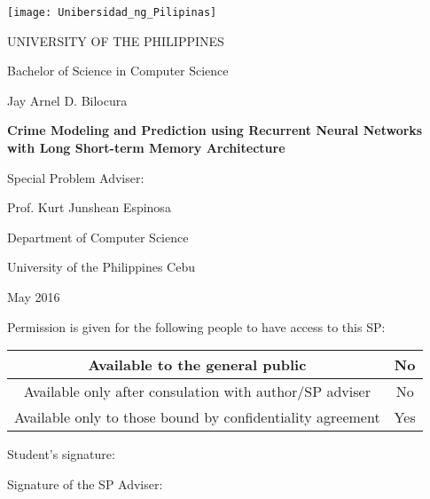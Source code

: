 \begin{permission}
    \texttt{[image: Unibersidad\_ng\_Pilipinas]}
    \par\MakeUppercase{University of the Philippines}
    \par Bachelor of Science in Computer Science
    \vspace{1cm}
    \par Jay Arnel D. Bilocura
    \vspace{1cm}
    \par\textbf{Crime Modeling and Prediction using Recurrent Neural Networks with Long Short-term Memory Architecture}
    \vspace{1cm}
    \par Special Problem Adviser:
    \par Prof. Kurt Junshean Espinosa
    \vspace{1cm}
    \par Department of Computer Science
    \par University of the Philippines Cebu
    \vspace{1cm}
    \par May 2016
    \vspace{1cm}
    \par Permission is given for the following people to have access to this SP:
    \begin{table}[H]
      \centering
      \begin{tabular}{|c|c|}
          \hline
          Available to the general public &No \\
          \hline
          Available only after consulation with author/SP adviser &No \\
          \hline
          Available only to those bound by confidentiality agreement &Yes \\
          \hline
        \end{tabular}
    \end{table}
    \par Student's signature: \hspace{3cm}
    \par Signature of the SP Adviser: \hspace{4cm}
\end{permission}